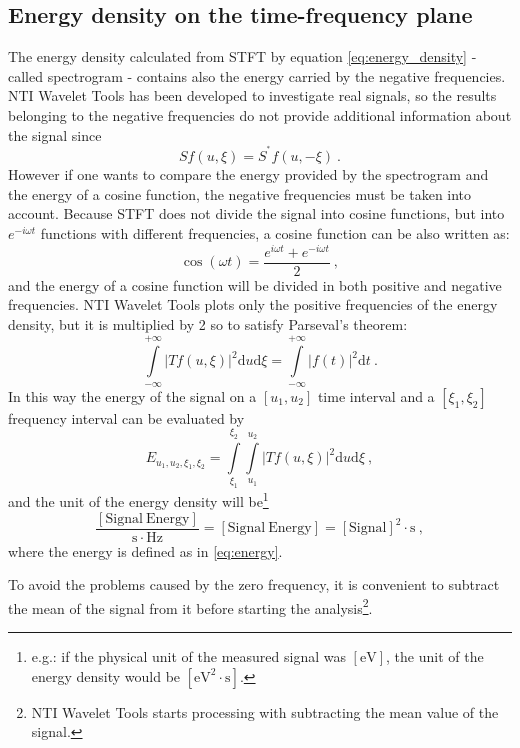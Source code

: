 \documentclass[a4paper,12pt,oneside]{article}
\newcommand{\dt}{\mathrm{d}t}
\newcommand{\du}{\mathrm{d}u}
\newcommand{\dxi}{\mathrm{d}\xi}
\newcommand{\conj}{^{\textstyle^*}}
\begin{document}
\subsection{Energy density on the time-frequency plane}

The energy density calculated from STFT by equation \eqref{eq:energy_density} - called spectrogram - contains also the energy carried by the negative frequencies. NTI Wavelet Tools has been developed to investigate real signals, so the results belonging to the negative frequencies do not provide additional information about the signal since
\begin{equation}\label{negative_freq}
  S f(u,\xi) = S\conj f(u,-\xi) \ .
\end{equation}
However if one wants to compare the energy provided by the spectrogram and the energy of a cosine function, the negative frequencies must be taken into account. Because STFT does not divide the signal into cosine functions, but into $e^{-i \omega t}$ functions with different frequencies, a cosine function can be also written as:
\begin{equation}\label{eq:cosine}
  \cos(\omega t) = \dfrac{e^{i\omega t} + e^{-i\omega t}}{2} \ ,
\end{equation}
and the energy of a cosine function will be divided in both positive and negative frequencies. NTI Wavelet Tools plots only the positive frequencies of the energy density, but it is multiplied by 2 so to satisfy Parseval's theorem:
\begin{equation}\label{eq:parseval}
  \int\limits_{-\infty}^{+\infty}  |T f(u,\xi)|^2 \du \dxi = \int\limits_{-\infty}^{+\infty}  |f(t)|^2 \dt \ .
\end{equation}
In this way the energy of the signal on a $[u_1, u_2]$ time interval and a $[\xi_1, \xi_2]$ frequency interval can be evaluated by
\begin{equation}\label{eq:energy_interval}
  E_{u_1, u_2, \xi_1, \xi_2} = \int\limits_{\xi_1}^{\xi_2} \int\limits_{u_1}^{u_2} |T f(u,\xi)|^2 \du \dxi \ ,
\end{equation}
and the unit of the energy density will be\footnote{e.g.: if the physical unit of the measured signal was $[\mathrm{eV}]$, the unit of the energy density would be $[\mathrm{eV}^2 \cdot \mathrm{s}]$.}
$$\dfrac{[\mathrm{Signal\ Energy}]}{\mathrm{s}\cdot\mathrm{Hz}} = [\mathrm{Signal\ Energy}] = [\mathrm{Signal}]^2\cdot \mathrm{s} \ ,$$ where the energy is defined as in \eqref{eq:energy}.

To avoid the problems caused by the zero frequency, it is convenient to subtract the mean of the signal from it before starting the analysis\footnote{NTI Wavelet Tools starts processing with subtracting the mean value of the signal.}.
\end{document}
